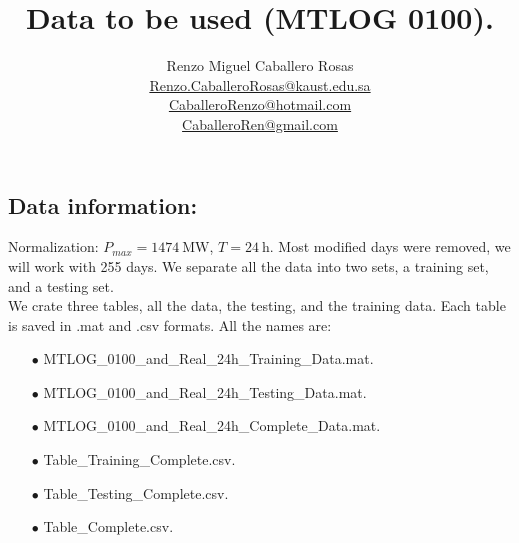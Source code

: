 \documentclass[12pt]{article}
\theoremstyle{definition}
\theoremstyle{remark}
\begin{document}
\title{Data to be used (MTLOG 0100).}
\author{Renzo Miguel Caballero Rosas\\
\url{Renzo.CaballeroRosas@kaust.edu.sa}\\
\url{CaballeroRenzo@hotmail.com}\\
\url{CaballeroRen@gmail.com}} 
\maketitle

\subsection*{Data information:}

Normalization: $P_{max}=\SI{1474}{\mega\watt}$, $T=\SI{24}{\hour}$. Most modified days were removed, we will work with 255 days. We separate all the data into two sets, a training set, and a testing set.\\
We crate three tables, all the data, the testing, and the training data. Each table is saved in .mat and .csv formats. All the names are:

\begin{enumerate}
\item[$\bullet$] MTLOG\_0100\_and\_Real\_24h\_Training\_Data.mat.
\item[$\bullet$] MTLOG\_0100\_and\_Real\_24h\_Testing\_Data.mat.
\item[$\bullet$] MTLOG\_0100\_and\_Real\_24h\_Complete\_Data.mat.
\item[$\bullet$] Table\_Training\_Complete.csv.
\item[$\bullet$] Table\_Testing\_Complete.csv.
\item[$\bullet$] Table\_Complete.csv.
\end{enumerate}
\end{document}
